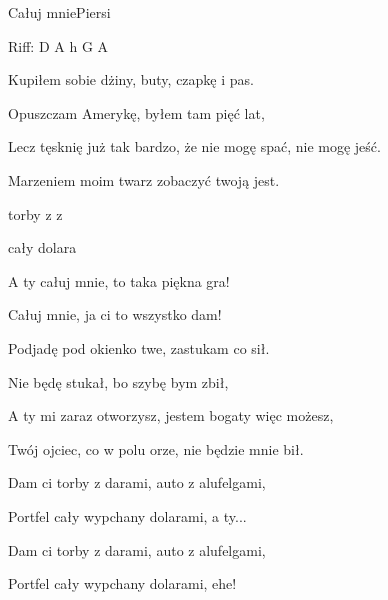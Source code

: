 \begin{song}{Całuj mnie}{}{}{Piersi}{}{}

Riff: D A h G A

  \begin{SBVerse}
    Kupiłem sobie dżiny, buty, czapkę i pas.

    Opuszczam Amerykę, byłem tam pięć lat,

    Lecz tęsknię już tak bardzo, że nie mogę spać, nie mogę jeść.

    Marzeniem moim twarz zobaczyć twoją jest.

     torby z   z 

     cały  dolara 
  \end{SBVerse}

  \begin{SBChorus}
    A ty całuj mnie, to taka piękna gra!

    Całuj mnie, ja ci to wszystko dam!
  \end{SBChorus}
  \begin{SBVerse}
    Podjadę pod okienko twe, zastukam co sił.

    Nie będę stukał, bo szybę bym zbił,

    A ty mi zaraz otworzysz, jestem bogaty więc możesz,

    Twój ojciec, co w polu orze, nie będzie mnie bił.

    Dam ci torby z darami, auto z alufelgami,

    Portfel cały wypchany dolarami, a ty...
  \end{SBVerse}
  \begin{SBChorus}
    Dam ci torby z darami, auto z alufelgami,

    Portfel cały wypchany dolarami, ehe!
  \end{SBChorus}
\end{song}
